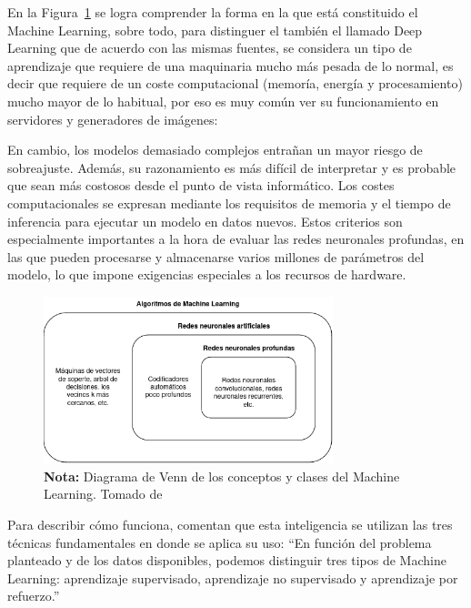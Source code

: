 En la Figura~\ref{fig:venn_diagram} se logra comprender la forma en la
que está constituido el Machine Learning, sobre todo, para distinguer el también 
el llamado Deep Learning que de acuerdo con las mismas fuentes, se considera un
tipo de aprendizaje que requiere de una maquinaria mucho más pesada de lo normal,
es decir que requiere de un coste computacional (memoría, energía y
procesamiento) mucho mayor de lo habitual, por eso es muy común ver su
funcionamiento en servidores y generadores de imágenes:

\begin{displayquote}
  En cambio, los modelos demasiado complejos entrañan un mayor riesgo de
  sobreajuste. Además, su razonamiento es más difícil de interpretar y es
  probable que sean más costosos desde el punto de vista informático. Los
  costes computacionales se expresan mediante los requisitos de memoria y el
  tiempo de inferencia para ejecutar un modelo en datos nuevos. Estos criterios
  son especialmente importantes a la hora de evaluar las redes neuronales
  profundas, en las que pueden procesarse y almacenarse varios millones de
  parámetros del modelo, lo que impone exigencias especiales a los recursos de
  hardware. \parencite{Janiesch2021}
\end{displayquote}

\begin{figure}[htb]
  \centering
  \includegraphics[width=0.75\textwidth]{./pictures/venn_diagram.png}
  \caption{
    \textbf{Nota:} Diagrama de Venn de los conceptos y clases del Machine
    Learning. Tomado de \cite{Janiesch2021}
  }
  \label{fig:venn_diagram}
\end{figure}

Para describir cómo funciona, \textcite{Janiesch2021} comentan que esta
inteligencia se utilizan las tres técnicas fundamentales en donde se aplica su
uso: ``En función del problema planteado y de los datos disponibles, podemos
distinguir tres tipos de Machine Learning: aprendizaje supervisado, aprendizaje
no supervisado y aprendizaje por refuerzo.''

